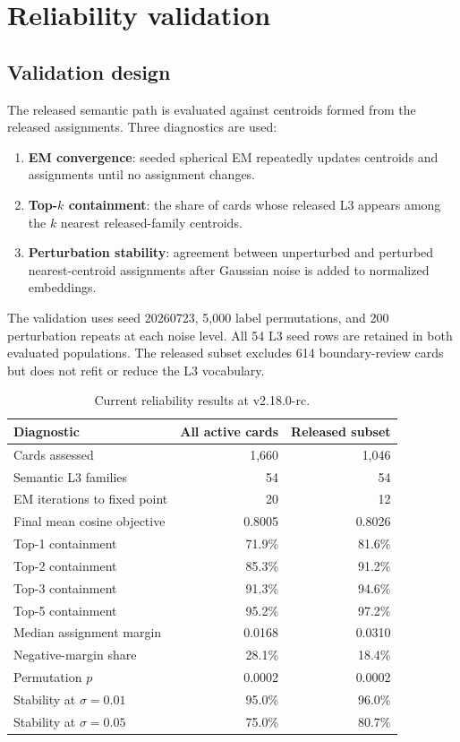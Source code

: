 \documentclass[11pt,a4paper]{article}
\begin{document}
\section{Reliability validation}

\subsection{Validation design}

The released semantic path is evaluated against centroids formed from the
released assignments. Three diagnostics are used:
\begin{enumerate}[leftmargin=2em]
  \item \textbf{EM convergence}: seeded spherical EM repeatedly updates
  centroids and assignments until no assignment changes.
  \item \textbf{Top-$k$ containment}: the share of cards whose released L3
  appears among the $k$ nearest released-family centroids.
  \item \textbf{Perturbation stability}: agreement between unperturbed and
  perturbed nearest-centroid assignments after Gaussian noise is added to
  normalized embeddings.
\end{enumerate}

The validation uses seed 20260723, 5,000 label permutations, and 200
perturbation repeats at each noise level. All 54 L3 seed rows are retained in
both evaluated populations. The released subset excludes 614 boundary-review
cards but does not refit or reduce the L3 vocabulary.

\begin{table}[H]
\centering
\caption{Current reliability results at v2.18.0-rc.}
\label{tab:validation}
\small
\begin{tabular}{lrr}
\toprule
Diagnostic & All active cards & Released subset \\
\midrule
Cards assessed & 1,660 & 1,046 \\
Semantic L3 families & 54 & 54 \\
EM iterations to fixed point & 20 & 12 \\
Final mean cosine objective & 0.8005 & 0.8026 \\
Top-1 containment & 71.9\% & 81.6\% \\
Top-2 containment & 85.3\% & 91.2\% \\
Top-3 containment & 91.3\% & 94.6\% \\
Top-5 containment & 95.2\% & 97.2\% \\
Median assignment margin & 0.0168 & 0.0310 \\
Negative-margin share & 28.1\% & 18.4\% \\
Permutation $p$ & 0.0002 & 0.0002 \\
Stability at $\sigma=0.01$ & 95.0\% & 96.0\% \\
Stability at $\sigma=0.05$ & 75.0\% & 80.7\% \\
\bottomrule
\end{tabular}
\end{table}
\end{document}
